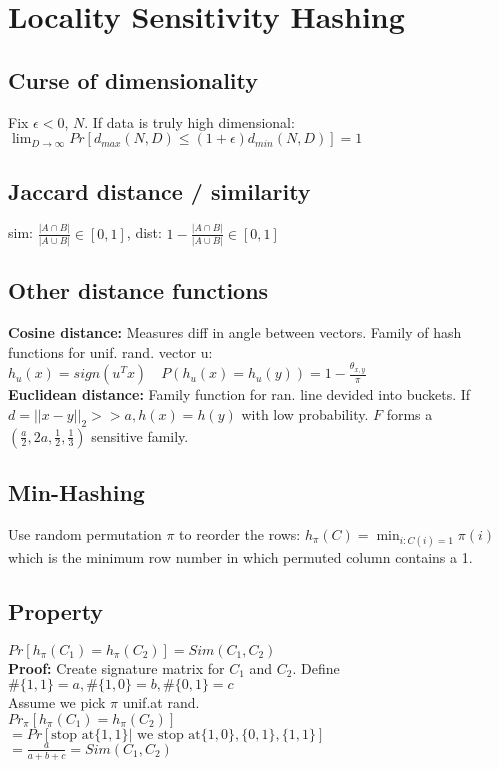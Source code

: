\section{Locality Sensitivity Hashing}
\subsection*{Curse of dimensionality}
Fix $\epsilon < 0$, $N$. If data is truly high dimensional:\\
$\displaystyle \lim_{D\rightarrow \infty} Pr[d_{max}(N,D) \leq (1+\epsilon) d_{min}(N,D)] = 1$

\subsection*{Jaccard distance / similarity}
sim: $\frac{|A \cap B|}{|A \cup B|} \in [0,1]$, dist: $1- \frac{|A \cap B|}{|A \cup B|} \in [0,1]$

\subsection*{Other distance functions}
\textbf{Cosine distance:} Measures diff in angle between vectors. Family of hash functions for unif. rand. vector u:\\
$h_u(x) = sign(u^Tx) \quad P(h_u(x) = h_u(y)) = 1- \frac{\theta_{x,y}}{\pi}$\\
\textbf{Euclidean distance:} Family function for ran. line devided into buckets. If $d=||x-y||_2 >> a, h(x)= h(y)$ with low probability. $F$ forms a $(\frac{a}{2}, 2a, \frac{1}{2}, \frac{1}{3})$ sensitive family.

\subsection*{Min-Hashing}
Use random permutation $\pi$ to reorder the rows: $h_\pi(C) = \min_{i:C(i) = 1} \pi(i)$
which is the minimum row number in which permuted column contains a 1.

\subsection*{Property}
$Pr[h_\pi(C_1) = h_\pi(C_2)] = Sim(C_1, C_2)$\\
\textbf{Proof:} Create signature matrix for $C_1$ and $C_2$. Define $\#\{1,1\} = a, \#\{1,0\} = b, \#\{0,1\} = c$\\
Assume we pick $\pi$ unif.at rand.\\
$Pr_\pi[h_\pi(C_1) = h_\pi(C_2)]$\\
$ = Pr[\text{stop at} \{1,1\} | \text{ we stop at} \{1,0\}, \{0,1\}, \{1,1\}]$\\
$ = \frac{a}{a+b+c} = Sim(C_1, C_2)$

